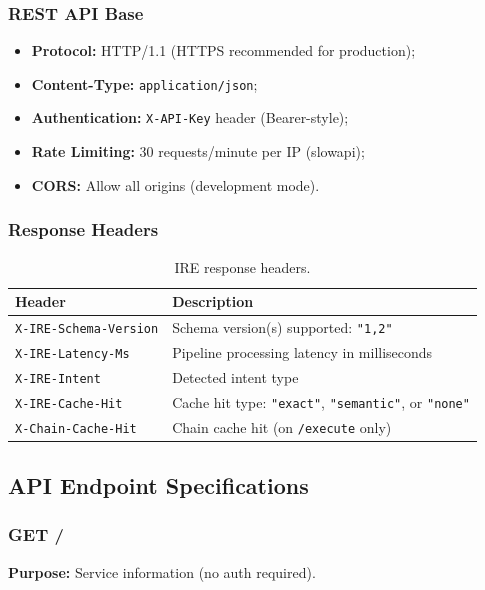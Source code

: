 ﻿\documentclass[10pt,journal,onecolumn]{IEEEtran}
\begin{document}
\subsubsection{REST API Base}
\begin{itemize}
\item \textbf{Protocol:} HTTP/1.1 (HTTPS recommended for production);
\item \textbf{Content-Type:} \texttt{application/json};
\item \textbf{Authentication:} \texttt{X-API-Key} header (Bearer-style);
\item \textbf{Rate Limiting:} 30 requests/minute per IP (slowapi);
\item \textbf{CORS:} Allow all origins (development mode).
\end{itemize}

\subsubsection{Response Headers}
\begin{table}[h]
\caption{IRE response headers.}
\label{tab:headers}
\begin{tabularx}{\columnwidth}{>{\ttfamily}l X}
\toprule
\textbf{Header} & \textbf{Description}\\
\midrule
\texttt{X-IRE-Schema-Version} & Schema version(s) supported: \texttt{"1,2"}\\
\texttt{X-IRE-Latency-Ms} & Pipeline processing latency in milliseconds\\
\texttt{X-IRE-Intent} & Detected intent type\\
\texttt{X-IRE-Cache-Hit} & Cache hit type: \texttt{"exact"}, \texttt{"semantic"}, or \texttt{"none"}\\
\texttt{X-Chain-Cache-Hit} & Chain cache hit (on \texttt{/execute} only)\\
\bottomrule
\end{tabularx}
\end{table}

\subsection{API Endpoint Specifications}

\subsubsection{GET /}
\textbf{Purpose:} Service information (no auth required).
\end{document}
